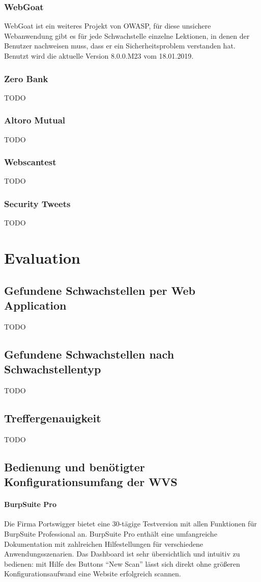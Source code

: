 \documentclass[12pt,oneside,a4paper,parskip]{scrbook}
\begin{document}
  \subsection{WebGoat}
  WebGoat ist ein weiteres Projekt von OWASP, für diese unsichere Webanwendung gibt es für jede Schwachstelle einzelne Lektionen, in denen der Benutzer nachweisen muss, dass er ein Sicherheitsproblem verstanden hat. Benutzt wird die aktuelle Version 8.0.0.M23 vom 18.01.2019.

  \subsection{Zero Bank}
  TODO
  \subsection{Altoro Mutual}
  TODO
  \subsection{Webscantest}
  TODO
  \subsection{Security Tweets}
  TODO


\chapter{Evaluation}
  \section{Gefundene Schwachstellen per Web Application}
  TODO
  \section{Gefundene Schwachstellen nach Schwachstellentyp}
  TODO
  \section{Treffergenauigkeit}
  TODO
  \section{Bedienung und benötigter Konfigurationsumfang der WVS}
  \subsubsection{BurpSuite Pro}
  Die Firma Portswigger bietet eine 30-tägige Testversion mit allen Funktionen für BurpSuite Professional an. BurpSuite Pro enthält eine umfangreiche Dokumentation mit zahlreichen Hilfestellungen für verschiedene Anwendungsszenarien.  Das Dashboard ist sehr übersichtlich und intuitiv zu bedienen: mit Hilfe des Buttons ``New Scan'' lässt sich direkt ohne größeren Konfigurationsaufwand eine Website erfolgreich scannen.
\end{document}
